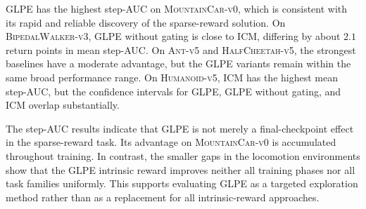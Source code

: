 GLPE has the highest step-AUC on \textsc{MountainCar-v0}, which is consistent with its rapid and reliable discovery of the sparse-reward solution.
On \textsc{BipedalWalker-v3}, GLPE without gating is close to ICM, differing by about $2.1$ return points in mean step-AUC.
On \textsc{Ant-v5} and \textsc{HalfCheetah-v5}, the strongest baselines have a moderate advantage, but the GLPE variants remain within the same broad performance range.
On \textsc{Humanoid-v5}, ICM has the highest mean step-AUC, but the confidence intervals for GLPE, GLPE without gating, and ICM overlap substantially.

The step-AUC results indicate that GLPE is not merely a final-checkpoint effect in the sparse-reward task.
Its advantage on \textsc{MountainCar-v0} is accumulated throughout training.
In contrast, the smaller gaps in the locomotion environments show that the GLPE intrinsic reward improves neither all training phases nor all task families uniformly.
This supports evaluating GLPE as a targeted exploration method rather than as a replacement for all intrinsic-reward approaches.